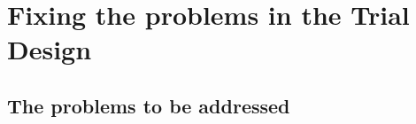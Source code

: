 \documentclass[a4paper,11pt]{article}
\newcommand{\pharmml}{PharmML\xspace}
\newcommand{\xelem}[1]{\texttt{<#1>}\index{XML Element!\texttt{<#1>}}}
\begin{document}



\section{Fixing the problems in the Trial Design}

\subsection{The problems to be addressed}
\end{document}
